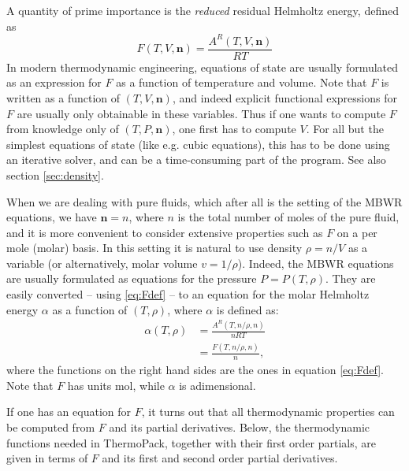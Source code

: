 \documentclass[internal,english]{sintefmemo2012}
\newcommand{\mbn}[0]{\mathbf n}
\numberwithin{equation}{section}
\begin{document}
A quantity of prime importance is the \textit{reduced} residual
Helmholtz energy, defined as
\begin{equation}
  \label{eq:Fdef}
  F(T,V,\mbn) = \frac{A^R(T,V,\mbn)}{RT}
\end{equation}
In modern thermodynamic engineering, equations of state are usually
formulated as an expression for $F$ as a function of temperature and
volume. Note that $F$ is written as a function of $(T,V,\mbn)$, and
indeed explicit functional expressions for $F$ are usually only
obtainable in these variables. Thus if one wants to compute $F$ from
knowledge only of $(T,P,\mbn)$, one first has to compute $V$. For all
but the simplest equations of state (like e.g. cubic equations), this has
to be done using an iterative solver, and can be a time-consuming part
of the program. See also section \ref{sec:density}.

When we are dealing with pure fluids, which after all is the setting
of the MBWR equations, we have $\mbn = n$, where $n$ is the total
number of moles of the pure fluid, and it is more convenient to
consider extensive properties such as $F$ on a per mole (molar)
basis. In this setting it is natural to use density $\rho = n/V$ as a
variable (or alternatively, molar volume $v = 1/\rho$). Indeed, the MBWR
equations are usually formulated as equations for the pressure $P =
P(T,\rho)$. They are easily converted -- using \eqref{eq:Fdef} -- to
an equation for the molar Helmholtz energy $\alpha$ as a function of
$(T,\rho)$, where $\alpha$ is defined as:
\begin{align}
  \alpha(T,\rho) &= \frac{A^R(T,n/\rho,n)}{nRT} \\
  &= \frac{F(T,n/\rho,n)}{n},
\end{align}
where the functions on the right hand sides are the ones in equation
\eqref{eq:Fdef}. Note that $F$ has units $\mathrm{mol}$, while
$\alpha$ is adimensional.

If one has an equation for $F$, it turns out that all thermodynamic
properties can be computed from $F$ and its partial
derivatives. Below, the thermodynamic functions needed in ThermoPack, together with their first
order partials, are given in terms of $F$ and its first and second
order partial derivatives.
\end{document}

